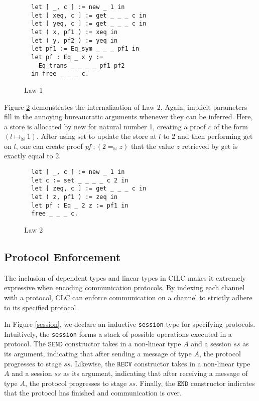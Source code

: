 \documentclass[sigplan,screen,review,authordraft]{acmart}
\newcommand{\new}{\text{new}}
\newcommand{\get}{\text{get}}
\newcommand{\set}{\text{set}}
\newcommand{\SEND}{\texttt{SEND}}
\newcommand{\RECV}{\texttt{RECV}}
\newcommand{\END}{\texttt{END}}
\begin{document}
\begin{figure}[h]
  \caption{Law 1}
  \begin{verbatim}
  let [ _, c ] := new _ 1 in
  let [ xeq, c ] := get _ _ _ c in
  let [ yeq, c ] := get _ _ _ c in
  let ( x, pf1 ) := xeq in
  let ( y, pf2 ) := yeq in
  let pf1 := Eq_sym _ _ _ pf1 in
  let pf : Eq _ x y := 
    Eq_trans _ _ _ _ pf1 pf2 
  in free _ _ _ c.
  \end{verbatim}
  \label{law1}
  \Description{}
\end{figure}

Figure \ref{law2} demonstrates the internalization of Law 2. Again, implicit parameters fill in the annoying bureaucratic arguments whenever they can be inferred. Here, a store is allocated by $\new$ for natural number 1, creating a proof $c$ of the form $(l \mapsto_\mathbb{N} 1)$. After using $\set$ to update the store at $l$ to 2 and then performing $\get$ on $l$, one can create proof \textit{pf} $: (2 =_\mathbb{N} z)$ that the value $z$ retrieved by $\get$ is exactly equal to 2.

\begin{figure}[h]
  \caption{Law 2}
  \begin{verbatim}
  let [ _, c ] := new _ 1 in
  let c := set _ _ _ _ c 2 in
  let [ zeq, c ] := get _ _ _ c in
  let ( z, pf1 ) := zeq in
  let pf : Eq _ 2 z := pf1 in
  free _ _ _ c.
  \end{verbatim}
  \label{law2}
  \Description{}
\end{figure}

\subsection{Protocol Enforcement}
The inclusion of dependent types and linear types in CILC makes it extremely expressive when encoding communication protocols. By indexing each channel with a protocol, CLC can enforce communication on a channel to strictly adhere to its specified protocol.

In Figure \ref{session}, we declare an inductive \texttt{session} type for specifying protocols. Intuitively, the \texttt{session}  forms a stack of possible operations executed in a protocol. The $\SEND$ constructor takes in a non-linear type $A$ and a session $ss$ as its argument, indicating that after sending a message of type $A$, the protocol progresses to stage $ss$. Likewise, the $\RECV$ constructor takes in a non-linear type $A$ and a session $ss$ as its argument, indicating that after receiving a message of type $A$, the protocol progresses to stage $ss$. Finally, the $\END$ constructor indicates that the protocol has finished and communication is over.
\end{document}
